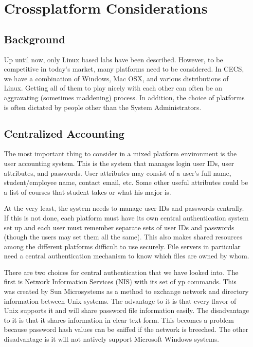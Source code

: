 \section{Crossplatform Considerations} \label{sec:crossplatform}
\subsection{Background}
Up until now, only Linux based labs have been described.  However, to be competitive in today's market, many platforms need to be considered.  In CECS, we have a combination of Windows, Mac OSX, and various distributions of Linux.   Getting all of them to play nicely with each other can often be an aggravating (sometimes maddening) process.  In addition, the choice of platforms is often dictated by people other than the System Administrators. 
\subsection{Centralized Accounting}
The most important thing to consider in a mixed platform environment is the user accounting system.  This is the system that manages login user IDs, user attributes, and passwords.  User attributes may consist of a user's full name, student/employee name, contact email, etc.  Some other useful attributes could be a list of courses that student takes or what his major is.  

At the very least, the system needs to manage user IDs and passwords centrally.  If this is not done, each platform must have its own central authentication system set up and each user must remember separate sets of user IDs and passwords (though the users may set them all the same).  This also makes shared resources among the different platforms difficult to use securely.  File servers in particular need a central authentication mechanism to know which files are owned by whom.  

There are two choices for central authentication that we have looked into.  The first is Network Information Services (NIS) with its set of yp commands.  This was created by Sun Microsystems as a method to exchange network and directory information between Unix systems.  The advantage to it is that every flavor of Unix supports it and will share password file information easily.  The disadvantage to it is that it shares information in clear text form.  This becomes a problem because password hash values can be sniffed if the network is breeched.  The other disadvantage is it will not natively support Microsoft Windows systems.  

